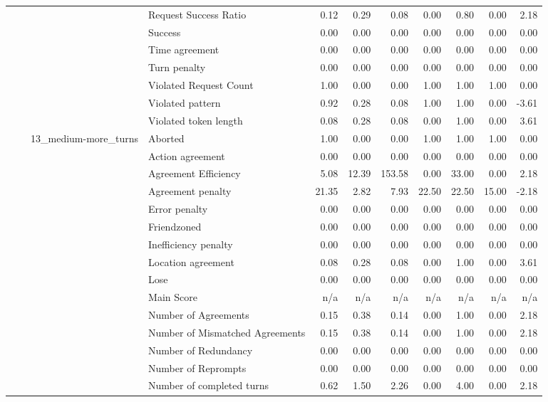 \begin{tabular}{llllrrrrrrr}
 &  &  & Request Success Ratio & 0.12 & 0.29 & 0.08 & 0.00 & 0.80 & 0.00 & 2.18 \\
 &  &  & Success & 0.00 & 0.00 & 0.00 & 0.00 & 0.00 & 0.00 & 0.00 \\
 &  &  & Time agreement & 0.00 & 0.00 & 0.00 & 0.00 & 0.00 & 0.00 & 0.00 \\
 &  &  & Turn penalty & 0.00 & 0.00 & 0.00 & 0.00 & 0.00 & 0.00 & 0.00 \\
 &  &  & Violated Request Count & 1.00 & 0.00 & 0.00 & 1.00 & 1.00 & 1.00 & 0.00 \\
 &  &  & Violated pattern & 0.92 & 0.28 & 0.08 & 1.00 & 1.00 & 0.00 & -3.61 \\
 &  &  & Violated token length & 0.08 & 0.28 & 0.08 & 0.00 & 1.00 & 0.00 & 3.61 \\
\cline{3-11}
 &  & \multirow[t]{27}{*}{13_medium-more_turns} & Aborted & 1.00 & 0.00 & 0.00 & 1.00 & 1.00 & 1.00 & 0.00 \\
 &  &  & Action agreement & 0.00 & 0.00 & 0.00 & 0.00 & 0.00 & 0.00 & 0.00 \\
 &  &  & Agreement Efficiency & 5.08 & 12.39 & 153.58 & 0.00 & 33.00 & 0.00 & 2.18 \\
 &  &  & Agreement penalty & 21.35 & 2.82 & 7.93 & 22.50 & 22.50 & 15.00 & -2.18 \\
 &  &  & Error penalty & 0.00 & 0.00 & 0.00 & 0.00 & 0.00 & 0.00 & 0.00 \\
 &  &  & Friendzoned & 0.00 & 0.00 & 0.00 & 0.00 & 0.00 & 0.00 & 0.00 \\
 &  &  & Inefficiency penalty & 0.00 & 0.00 & 0.00 & 0.00 & 0.00 & 0.00 & 0.00 \\
 &  &  & Location agreement & 0.08 & 0.28 & 0.08 & 0.00 & 1.00 & 0.00 & 3.61 \\
 &  &  & Lose & 0.00 & 0.00 & 0.00 & 0.00 & 0.00 & 0.00 & 0.00 \\
 &  &  & Main Score & n/a & n/a & n/a & n/a & n/a & n/a & n/a \\
 &  &  & Number of Agreements & 0.15 & 0.38 & 0.14 & 0.00 & 1.00 & 0.00 & 2.18 \\
 &  &  & Number of Mismatched Agreements & 0.15 & 0.38 & 0.14 & 0.00 & 1.00 & 0.00 & 2.18 \\
 &  &  & Number of Redundancy & 0.00 & 0.00 & 0.00 & 0.00 & 0.00 & 0.00 & 0.00 \\
 &  &  & Number of Reprompts & 0.00 & 0.00 & 0.00 & 0.00 & 0.00 & 0.00 & 0.00 \\
 &  &  & Number of completed turns & 0.62 & 1.50 & 2.26 & 0.00 & 4.00 & 0.00 & 2.18 \\

\end{tabular}

